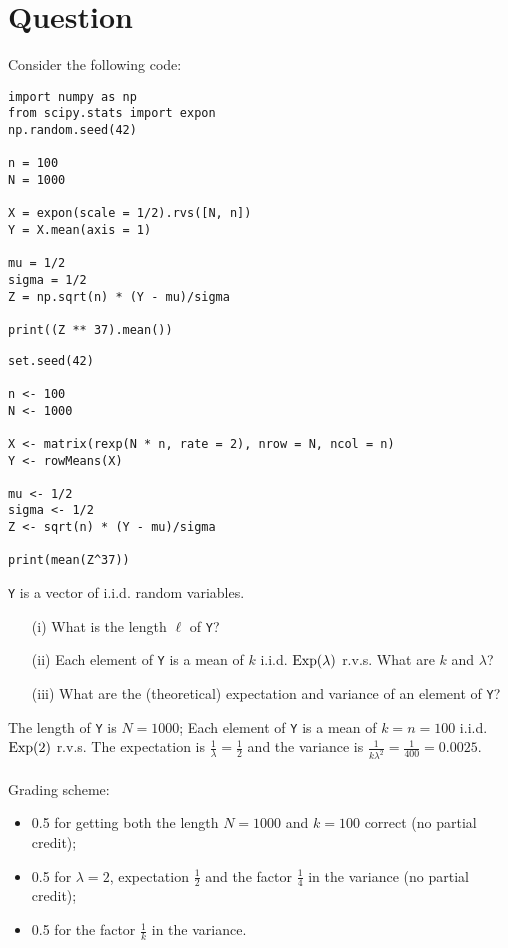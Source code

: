 \section{Question}

Consider the following code:

\begin{verbatim}
import numpy as np
from scipy.stats import expon
np.random.seed(42)

n = 100
N = 1000

X = expon(scale = 1/2).rvs([N, n])
Y = X.mean(axis = 1)

mu = 1/2
sigma = 1/2
Z = np.sqrt(n) * (Y - mu)/sigma

print((Z ** 37).mean())
\end{verbatim}

\begin{verbatim}
set.seed(42)

n <- 100
N <- 1000

X <- matrix(rexp(N * n, rate = 2), nrow = N, ncol = n)
Y <- rowMeans(X)

mu <- 1/2
sigma <- 1/2
Z <- sqrt(n) * (Y - mu)/sigma

print(mean(Z^37))
\end{verbatim}

\vspace*{20pt}


\begin{exercise}[1.5]
\texttt{Y} is a vector of i.i.d. random variables.

\begin{itemize}
\item[(i)] What is the length $\ell$ of \texttt{Y}?
\item[(ii)] Each element of \texttt{Y} is a mean of $k$ i.i.d. $\mathrm{Exp}(\lambda)$ r.v.s.
What are $k$ and $\lambda$?  
\item[(iii)] What are the (theoretical) expectation and variance of an element of \texttt{Y}? 
\end{itemize} 

\begin{solution}
The length of \texttt{Y} is $N = 1000$;  Each element of \texttt{Y} is a mean of $k = n = 100$ i.i.d. $\mathrm{Exp}(2)$ r.v.s.
The expectation is $\frac1\lambda = \frac12$ and the variance is $\frac1{k \lambda^2} = \frac1{400} = 0.0025$. \\ \\
Grading scheme:
\begin{itemize}
\item 0.5 for getting both the length $N=1000$ and  $k=100$ correct (no partial credit);
\item 0.5 for $\lambda = 2$, expectation $\frac12$ and the factor $\frac14$ in the variance (no partial credit);
\item 0.5 for the factor $\frac1{k}$ in the variance.
\end{itemize}
\end{solution}
\end{exercise}

